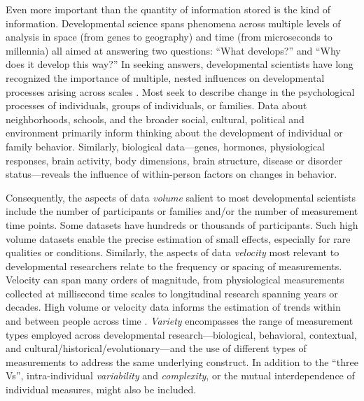 \documentclass[letterpaper,man,apacite,natbib]{apa6}
\begin{document}
Even more important than the quantity of information stored is the kind of information.
Developmental science spans phenomena across multiple levels of analysis in space (from genes to geography) and time (from microseconds to millennia) all aimed at answering two questions: ``What develops?'' and  ``Why does it develop this way?''
In seeking answers, developmental scientists have long recognized the importance of multiple, nested influences on developmental processes arising across scales \cite{elman_rethinking_1998,gottlieb_normally_1998,oyama_ontogeny_2000,vygotsky_mind_1980}.
Most seek to describe change in the psychological processes of individuals, groups of individuals, or families.
Data about neighborhoods, schools, and the broader social, cultural, political and environment primarily inform thinking about the development of individual or family behavior.
Similarly, biological data---genes, hormones, physiological responses, brain activity, body dimensions, brain structure, disease or disorder status---reveals the influence of within-person factors on changes in behavior.

Consequently, the aspects of data \emph{volume} salient to most developmental scientists include the number of participants or families and/or the number of measurement time points.
Some datasets have hundreds or thousands of participants.
Such high volume datasets enable the precise estimation of small effects, especially for rare qualities or conditions.
Similarly, the aspects of data \emph{velocity} most relevant to developmental researchers relate to the frequency or spacing of measurements.
Velocity can span many orders of magnitude, from physiological measurements collected at millisecond time scales to longitudinal research spanning years or decades.
High volume or velocity data informs the estimation of trends within and between people across time \cite{rietveld_replicability_2014}.
\emph{Variety} encompasses the range of measurement types employed across developmental research---biological, behavioral, contextual, and cultural/historical/evolutionary---and the use of different types of measurements to address the same underlying construct.
In addition to the ``three Vs'', intra-individual \emph{variability} and \emph{complexity}, or the mutual interdependence of individual measures, might also be included.
\end{document}
